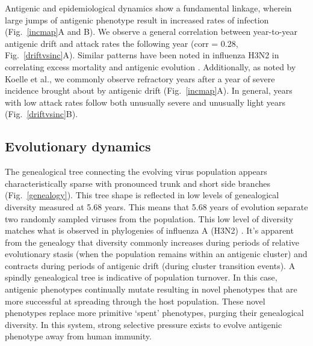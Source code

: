 \documentclass[11pt,oneside,letterpaper]{article}
\begin{document}
Antigenic and epidemiological dynamics show a fundamental linkage, wherein large jumps of antigenic phenotype result in increased rates of infection (Fig.~\ref{incmap}A and B).  We observe a general correlation between year-to-year antigenic drift and attack rates the following year (corr = 0.28, Fig.~\ref{driftvsinc}A).  Similar patterns have been noted in influenza H3N2 in correlating excess mortality and antigenic evolution \cite{Wu10}.  Additionally, as noted by Koelle et al.\cite{Koelle06}, we commonly observe refractory years after a year of severe incidence brought about by antigenic drift (Fig.~\ref{incmap}A).  In general, years with low attack rates follow both unusually severe and unusually light years (Fig.~\ref{driftvsinc}B).

\subsection*{Evolutionary dynamics}

The genealogical tree connecting the evolving virus population appears characteristically sparse with pronounced trunk and short side branches  (Fig.~\ref{genealogy}).  This tree shape is reflected in low levels of genealogical diversity measured at 5.68 years.  This means that 5.68 years of evolution separate two randomly sampled viruses from the population.  This low level of diversity matches what is observed in phylogenies of influenza A (H3N2) \cite{Rambaut08}.  It's apparent from the genealogy that diversity commonly increases during periods of relative evolutionary stasis (when the population remains within an antigenic cluster) and contracts during periods of antigenic drift (during cluster transition events).  A spindly genealogical tree is indicative of population turnover.  In this case, antigenic phenotypes continually mutate resulting in novel phenotypes that are more successful at spreading through the host population.  These novel phenotypes replace more primitive `spent' phenotypes, purging their genealogical diversity.  In this system, strong selective pressure exists to evolve antigenic phenotype away from human immunity.
\end{document}
